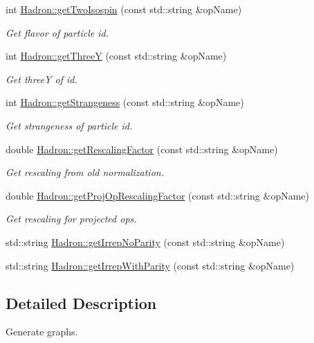 \begin{DoxyCompactItemize}
int \mbox{\hyperlink{namespaceHadron_a28f936e0038f56334a16574038c9aa0b}{Hadron\+::get\+Two\+Isospin}} (const std\+::string \&op\+Name)
\begin{DoxyCompactList}\small\item\em Get flavor of particle id. \end{DoxyCompactList}\item 
int \mbox{\hyperlink{namespaceHadron_a8739169b4caffa5f8bab802592b3302a}{Hadron\+::get\+ThreeY}} (const std\+::string \&op\+Name)
\begin{DoxyCompactList}\small\item\em Get threeY of id. \end{DoxyCompactList}\item 
int \mbox{\hyperlink{namespaceHadron_adfdd6762b0b73d56c308a674d4c0164d}{Hadron\+::get\+Strangeness}} (const std\+::string \&op\+Name)
\begin{DoxyCompactList}\small\item\em Get strangeness of particle id. \end{DoxyCompactList}\item 
double \mbox{\hyperlink{namespaceHadron_abc76a2d893a589ba2a1a346954901854}{Hadron\+::get\+Rescaling\+Factor}} (const std\+::string \&op\+Name)
\begin{DoxyCompactList}\small\item\em Get rescaling from old normalization. \end{DoxyCompactList}\item 
double \mbox{\hyperlink{namespaceHadron_aeb564a291631b101c405d7f4257391f8}{Hadron\+::get\+Proj\+Op\+Rescaling\+Factor}} (const std\+::string \&op\+Name)
\begin{DoxyCompactList}\small\item\em Get rescaling for projected ops. \end{DoxyCompactList}\item 
std\+::string \mbox{\hyperlink{namespaceHadron_ae2543483bce4c1e4b6c9ca56d01fe9ac}{Hadron\+::get\+Irrep\+No\+Parity}} (const std\+::string \&op\+Name)
\item 
std\+::string \mbox{\hyperlink{namespaceHadron_a0f40c5d7e590d17294e0a27e231c0a4b}{Hadron\+::get\+Irrep\+With\+Parity}} (const std\+::string \&op\+Name)
\end{DoxyCompactItemize}


\subsection{Detailed Description}
Generate graphs. 



